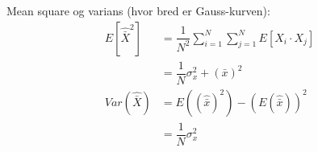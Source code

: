 \documentclass[Main]{subfiles}
\begin{document}
Mean square og varians (hvor bred er Gauss-kurven):
\begin{align*}
E[\hat{\bar{X}}^2] &= \dfrac{1}{N^2} \sum_{i=1}^N \sum_{j=1}^N E[X_i \cdot X_j] \\
	&= \dfrac{1}{N} \sigma_x^2+(\bar{x})^2 \\
Var(\hat{\bar{X}}) &= E(( \hat{\bar{x}})^2) - ( E(\hat{\bar{x}}))^2 \\
	&= \dfrac{1}{N} \sigma_x^2
\end{align*}

\end{document}
